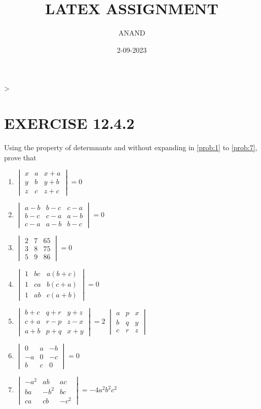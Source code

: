\documentclass{article}
\theoremstyle{remark}
\begin{document}
\title{LATEX ASSIGNMENT}
\author{ANAND}
\date{2-09-2023}
\maketitle                                                                       >
\section*{EXERCISE 12.4.2}
Using the property of determnants and without expanding in \ref{prob:1} to \ref{prob:7}, prove that
\begin{enumerate}
\item $\begin{vmatrix} x&a&x+a\\ y&b&y+b\\ z&c&z+c \end{vmatrix}=0$\label{prob:1}
\item $\begin{vmatrix} a-b&b-c&c-a\\ b-c&c-a&a-b\\ c-a&a-b&b-c \end{vmatrix}=0$
\item $\begin{vmatrix} 2&7&65\\ 3&8&75\\ 5&9&86 \end{vmatrix}=0$
\item $\begin{vmatrix} 1&bc&a(b+c)\\ 1&ca&b(c+a)\\ 1&ab&c(a+b) \end{vmatrix}=0$
\item $\begin{vmatrix} b+c&q+r&y+z\\ c+a&r-p&z-x\\ a+b&p+q&x+y \end{vmatrix}=2$ $\begin{vmatrix} a&p&x\\ b&q&y\\ c&r&z \end{vmatrix}$
\item $\begin{vmatrix} 0&a&-b\\ -a&0&-c\\ b&c&0 \end{vmatrix}=0$
\item $\begin{vmatrix} -a^2&ab&ac\\ ba&-b^2&bc\\ ca&cb&-c^2 \end{vmatrix} = -4a^2b^2c^2$ \label{prob:7}
\end{enumerate}
\end{document}
